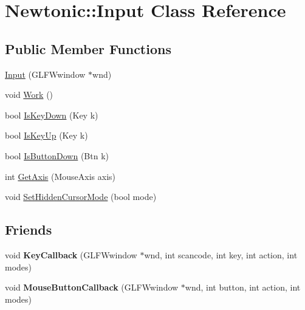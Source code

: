 \hypertarget{classNewtonic_1_1Input}{}\section{Newtonic\+::Input Class Reference}
\label{classNewtonic_1_1Input}
\subsection*{Public Member Functions}
\begin{DoxyCompactItemize}
\item 
\mbox{\hyperlink{classNewtonic_1_1Input_a5342c596700be9d4fe9b392cf2d416b7}{Input}} (G\+L\+F\+Wwindow $\ast$wnd)
\item 
void \mbox{\hyperlink{classNewtonic_1_1Input_aeaf973089f2de350c1189446332c298d}{Work}} ()
\item 
bool \mbox{\hyperlink{classNewtonic_1_1Input_a70ff2b8ec9b2a1792f8aa57fa7d29a34}{Is\+Key\+Down}} (Key k)
\item 
bool \mbox{\hyperlink{classNewtonic_1_1Input_a856bd9a3e0759dfc9cb5311ca401a699}{Is\+Key\+Up}} (Key k)
\item 
bool \mbox{\hyperlink{classNewtonic_1_1Input_a9543a9322b8adcfd7ee3ecc7c6d67005}{Is\+Button\+Down}} (Btn k)
\item 
int \mbox{\hyperlink{classNewtonic_1_1Input_a17f37f19abb62bded208634e1b616e22}{Get\+Axis}} (Mouse\+Axis axis)
\item 
void \mbox{\hyperlink{classNewtonic_1_1Input_aa316306c91cb310db00e6163093cea5c}{Set\+Hidden\+Cursor\+Mode}} (bool mode)
\end{DoxyCompactItemize}
\subsection*{Friends}
\begin{DoxyCompactItemize}
\item 
\mbox{\label{classNewtonic_1_1Input_a648364d96c0987d39aa237a04453cefb}} 
void {\bfseries Key\+Callback} (G\+L\+F\+Wwindow $\ast$wnd, int scancode, int key, int action, int modes)
\item 
\mbox{\label{classNewtonic_1_1Input_a2098f3f1aec23cac8ab62c25c83e7650}} 
void {\bfseries Mouse\+Button\+Callback} (G\+L\+F\+Wwindow $\ast$wnd, int button, int action, int modes)
\end{DoxyCompactItemize}


